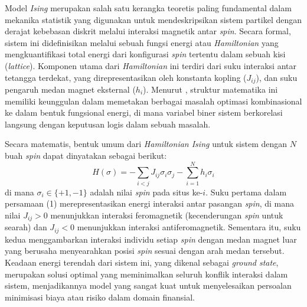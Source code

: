 Model \textit{Ising} merupakan salah satu kerangka teoretis paling fundamental dalam mekanika statistik yang digunakan untuk mendeskripsikan sistem partikel dengan derajat kebebasan diskrit melalui interaksi magnetik antar \textit{spin}. Secara formal, sistem ini didefinisikan melalui sebuah fungsi energi atau \textit{Hamiltonian} yang mengkuantifikasi total energi dari konfigurasi \textit{spin} tertentu dalam sebuah kisi (\textit{lattice}). Komponen utama dari \textit{Hamiltonian} ini terdiri dari suku interaksi antar tetangga terdekat, yang direpresentasikan oleh konstanta kopling ($J_{ij}$), dan suku pengaruh medan magnet eksternal ($h_i$). Menurut \cite{lucas_ising_2014}, struktur matematika ini memiliki keunggulan dalam memetakan berbagai masalah optimasi kombinasional ke dalam bentuk fungsional energi, di mana variabel biner sistem berkorelasi langsung dengan keputusan logis dalam sebuah masalah.

Secara matematis, bentuk umum dari \textit{Hamiltonian Ising} untuk sistem dengan $N$ buah \textit{spin} dapat dinyatakan sebagai berikut:
\begin{equation}
    H(\sigma) = -\sum_{i < j} J_{ij} \sigma_i \sigma_j - \sum_{i=1}^{N} h_i \sigma_i
\end{equation}
di mana $\sigma_i \in \{+1, -1\}$ adalah nilai \textit{spin} pada situs ke-$i$. Suku pertama dalam persamaan (1) merepresentasikan energi interaksi antar pasangan \textit{spin}, di mana nilai $J_{ij} > 0$ menunjukkan interaksi feromagnetik (kecenderungan \textit{spin} untuk searah) dan $J_{ij} < 0$ menunjukkan interaksi antiferomagnetik. Sementara itu, suku kedua menggambarkan interaksi individu setiap \textit{spin} dengan medan magnet luar yang berusaha menyearahkan posisi \textit{spin} sesuai dengan arah medan tersebut. Keadaan energi terendah dari sistem ini, yang dikenal sebagai \textit{ground state}, merupakan solusi optimal yang meminimalkan seluruh konflik interaksi dalam sistem, menjadikannya model yang sangat kuat untuk menyelesaikan persoalan minimisasi biaya atau risiko dalam domain finansial.

